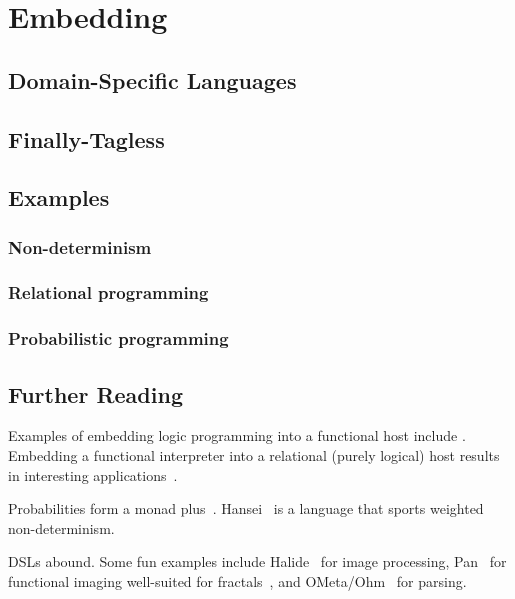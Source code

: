 \chapter{Embedding}

\section{Domain-Specific Languages}
\section{Finally-Tagless}
\section{Examples}
\subsection{Non-determinism}
\subsection{Relational programming}
\subsection{Probabilistic programming}

\section{Further Reading}

Examples of embedding logic programming into a functional host include \cite{seres,miniKanren,microKanren}. Embedding a functional interpreter into a relational (purely logical) host results in interesting applications~\citep{mk-icfp}.

Probabilities form a monad plus~\citep{ramsey,expertfsharp}. Hansei~\citep{hansei} is a language that sports weighted non-determinism.

DSLs abound. Some fun examples include Halide~\citep{halide} for image
processing, Pan~\citep{pan-fun,pan-compile} for functional imaging
well-suited for fractals~\cite{composing-fractals}, and
OMeta/Ohm~\citep{ometa} for parsing.
